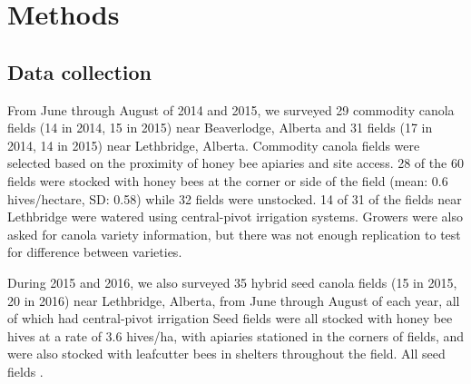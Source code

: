 \documentclass[12pt, draft]{article} %
\begin{document}
\section{Methods}

\subsection{Data collection}
From June through August of 2014 and 2015, we surveyed 29 commodity canola fields (14 in 2014, 15 in 2015) near Beaverlodge, Alberta and 31 fields (17 in 2014, 14 in 2015) near Lethbridge, Alberta.
Commodity canola fields were selected based on the proximity of honey bee apiaries and site access. 
28 of the 60 fields were stocked with honey bees at the corner or side of the field (mean: 0.6 hives/hectare, SD: 0.58) while 32 fields were unstocked. %
14 of 31 of the fields near Lethbridge were watered using central-pivot irrigation systems.
Growers were also asked for canola variety information, but there was not enough replication to test for difference between varieties.

During 2015 and 2016, we also surveyed 35 hybrid seed canola fields (15 in 2015, 20 in 2016) near Lethbridge, Alberta, from June through August of each year, all of which had central-pivot irrigation
Seed fields were all stocked with honey bee hives at a rate of 3.6 hives/ha, with apiaries stationed in the corners of fields, and were also stocked with leafcutter bees in shelters throughout the field.
All seed fields .
\end{document}
